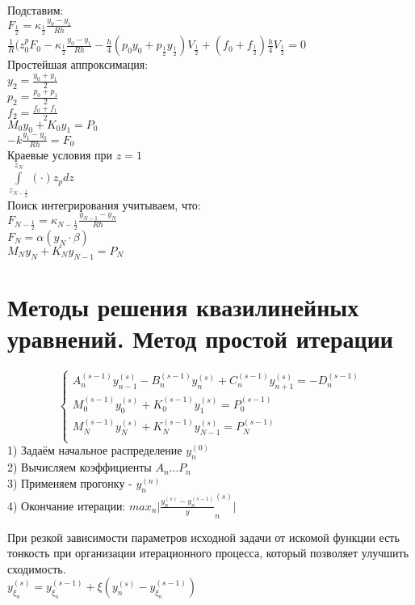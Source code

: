 Подставим:\\
$F_{\frac{1}{2}} = \kappa_{\frac{1}{2}} \frac{y_0 - y_1}{Rh}$\\
$\frac{1}{R}(z_0^p F_0 - \kappa_{\frac{1}{2}}\frac{y_0 - y_1}{Rh} - \frac{h}{4}(p_0 y_0 + p_{\frac{1}{2}} y_{\frac{1}{2}}) V_{\frac{1}{2}} + (f_0 + f_{\frac{1}{2}})\frac{h}{4} V_{\frac{1}{2}} = 0$\\
Простейшая аппроксимация:\\
$y_2 = \frac{y_0 + y_1}{2}$\\
$p_2 = \frac{p_0 + p_1}{2}$\\
$f_2 = \frac{f_0 + f_1}{2}$\\
$M_0 y_0 + K_0 y_1 = P_0$\\
$-k\frac{y_1 - y_0}{Rh} = F_0$\\

Краевые условия при $z = 1$\\
$\int\limits_{z_{N-\frac{1}{2}}}^{z_N} (\cdot) z_p dz$\\
Поиск интегрирования учитываем, что:\\
$F_{N-\frac{1}{2}} = \kappa_{N-\frac{1}{2}}\frac{y_{N-1} - y_N}{Rh}$\\
$F_N = \alpha(y_N \cdot \beta)$\\
$M_N y_N + K_N y_{N-1} = P_N$\\

\section{Методы решения квазилинейных уравнений. Метод простой итерации}
\begin{equation}
\begin{cases}
A_n^{(s-1)} y_{n-1}^{(s)} - B_n^{(s-1)} y_n^{(s)} + C_n^{(s-1)} y^{(s)}_{n+1} = -D_{n}^{(s-1)}\\
M_0^{(s-1)} y_0^{(s)} + K_{0}^{(s-1)} y_1^{(s)} = P_0^{(s-1)}\\
M_N^{(s-1)} y_N^{(s)} + K_N^{(s-1)} y_{N-1}^{(s)} = P_N^{(s-1)}\\
\end{cases}
\end{equation}
1) Задаём начальное распределение $y_n^{(0)}$\\
2) Вычисляем коэффициенты $A_n ... P_n$\\
3) Применяем прогонку - $y_n^{(n)}$\\
4) Окончание итерации: $max_{n} \bigg|\frac{y_n^{(s)} - y_n^{(s - 1)}}y_{n}^{(s)}{}\bigg|$

При резкой зависимости параметров исходной задачи от искомой функции есть тонкость при организации итерационного процесса, который позволяет улучшить сходимость.\\
$y_{\xi_n}^{(s)} = y_{\xi_n}^{(s-1)} + \xi(y_n^{(s)} - y_{\xi_n}^{(s - 1)})$\\

